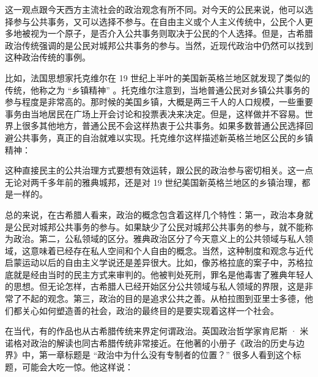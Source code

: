 
这一观点跟今天西方主流社会的政治观念有所不同。对今天的公民来说，他可以选择参与公共事务，又可以选择不参与。在自由主义或个人主义传统中，公民个人更多地被视为一个原子，是否介入公共事务则取决于公民的个人选择。但是，古希腊政治传统强调的是公民对城邦公共事务的参与。当然，近现代政治中仍然可以找到这种政治传统的事例。

比如，法国思想家托克维尔在 19 世纪上半叶的美国新英格兰地区就发现了类似的传统，他称之为 “乡镇精神” 。托克维尔注意到，当地普通公民对乡镇公共事务的参与程度是非常高的。那时候的美国乡镇，大概是两三千人的人口规模，一些重要事务由当地居民在广场上开会讨论和投票表决来决定。但是，这样做并不容易。世界上很多其他地方，普通公民不会这样热衷于公共事务。如果多数普通公民选择回避公共事务，真正的自治就难以实现。托克维尔这样描述新英格兰地区公民的乡镇精神：


这种直接民主的公共治理方式要想有效运转，跟公民的政治参与密切相关。这一点无论对两千多年前的雅典城邦，还是对 19 世纪美国新英格兰地区的乡镇治理，都是一样的。

总的来说，在古希腊人看来，政治的概念包含着这样几个特性：第一，政治本身就是公民对城邦公共事务的参与。如果缺少了公民对城邦公共事务的参与，就不能称为政治。第二，公私领域的区分。雅典政治区分了今天意义上的公共领域与私人领域，这意味着已经存在私人空间和个人自由的概念。当然，这种制度和观念与近代启蒙运动以后的自由主义学说还是差异很大。比如，像苏格拉底的案子中，苏格拉底就是经由当时的民主方式来审判的。他被判处死刑，罪名是他毒害了雅典年轻人的思想。但无论怎样，古希腊人已经开始区分公共领域与私人领域的界限，这是非常了不起的观念。第三，政治的目的是追求公共之善。从柏拉图到亚里士多德，他们都关心如何塑造善的社会，政治的最终目的是要实现着这样一个社会。

在当代，有的作品也从古希腊传统来界定何谓政治。英国政治哲学家肯尼斯 · 米诺格对政治的解读也同古希腊传统非常接近。在他著的小册子《政治的历史与边界》中，第一章标题是 “政治中为什么没有专制者的位置？” 很多人看到这个标题，可能会大吃一惊。他这样说：


